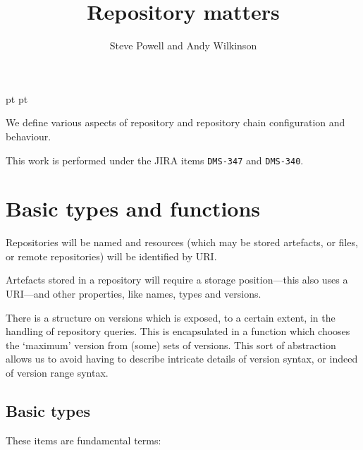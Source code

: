 \documentclass[a4paper,titlepage,twoside,12pt]{article}
\begin{document}
 pt
 pt

\title{Repository matters}
\author{Steve Powell and Andy Wilkinson}
\maketitle
\thispagestyle{myheadings}
\setcounter{page}{0}

We define various aspects of repository and repository chain configuration and behaviour.

This work is performed under the JIRA items \texttt{DMS-347} and \texttt{DMS-340}.


\newcommand{\true}{true}
\newcommand{\false}{false}

\clearpage
\tableofcontents

\clearpage
{}

\section{Basic types and functions}
Repositories will be named and resources (which may be stored artefacts, or files, or remote repositories) will be identified by URI.

Artefacts stored in a repository will require a storage position---this also uses a URI---and other properties, like names, types and versions.

There is a structure on versions which is exposed, to a certain extent, in the handling of repository queries. This is encapsulated in a function which chooses the `maximum' version from (some) sets of versions. This sort of abstraction allows us to avoid having to describe intricate details of version syntax, or indeed of version range syntax.

\subsection{Basic types}
These items are fundamental terms:
\begin{zed}
\end{zed}
\end{document}
